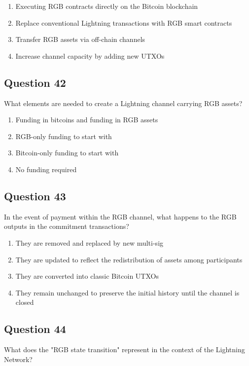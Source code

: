 \documentclass[12pt,a4paper]{article}
\begin{document}
\begin{enumerate}[label=\Alph*., leftmargin=*]
\item Executing RGB contracts directly on the Bitcoin blockchain
\item Replace conventional Lightning transactions with RGB smart contracts
\item Transfer RGB assets via off-chain channels
\item Increase channel capacity by adding new UTXOs
\end{enumerate}

\bigskip


\subsection*{Question 42}
What elements are needed to create a Lightning channel carrying RGB assets?

\begin{enumerate}[label=\Alph*., leftmargin=*]
\item Funding in bitcoins and funding in RGB assets
\item RGB-only funding to start with
\item Bitcoin-only funding to start with
\item No funding required
\end{enumerate}

\bigskip


\subsection*{Question 43}
In the event of payment within the RGB channel, what happens to the RGB outputs in the commitment transactions?

\begin{enumerate}[label=\Alph*., leftmargin=*]
\item They are removed and replaced by new multi-sig
\item They are updated to reflect the redistribution of assets among participants
\item They are converted into classic Bitcoin UTXOs
\item They remain unchanged to preserve the initial history until the channel is closed
\end{enumerate}

\bigskip


\subsection*{Question 44}
What does the "RGB state transition" represent in the context of the Lightning Network?
\end{document}
